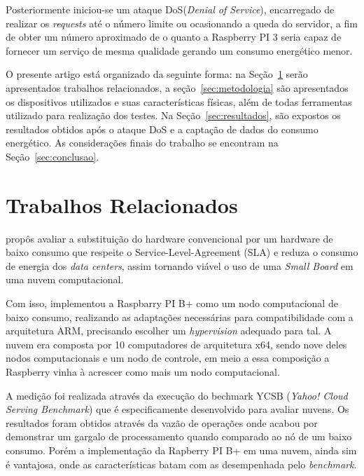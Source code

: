 \documentclass[12pt]{article}
\begin{document}
  Posteriormente iniciou-se um ataque DoS(\textit{Denial of Service}), encarregado de realizar os \textit{requests} até o número limite ou ocasionando a queda do servidor, a fim de obter um número aproximado de o quanto a Raspberry PI 3 seria capaz de fornecer um serviço de mesma qualidade gerando um consumo energético menor.



  O presente artigo está organizado da seguinte forma: na Seção~\ref{sec:trabCorrelatos} serão apresentados trabalhos relacionados, a seção~\ref{sec:metodologia} são apresentados os dispositivos utilizados e suas características físicas, além de todas ferramentas utilizado para realização dos testes. Na Seção~\ref{sec:resultados}, são expostos os resultados obtidos após o ataque DoS e a captação de dados do consumo energético. As considerações finais do trabalho se encontram na Seção~\ref{sec:conclusao}.


\section{Trabalhos Relacionados} \label{sec:trabCorrelatos}
  
 
   \cite{Joao} propôs avaliar a substituição do hardware convencional por um hardware de baixo consumo que respeite o Service-Level-Agreement (SLA) e reduza o consumo de energia dos \textit{data centers}, assim tornando viável o uso de uma \textit{Small Board} em uma nuvem computacional.

  Com isso, implementou a Raspbarry PI B+ como um nodo computacional de baixo consumo, realizando as adaptações necessárias para compatibilidade com a arquitetura ARM, precisando escolher um \textit{hypervision} adequado para tal. A nuvem era composta por 10 computadores de arquitetura x64, sendo nove deles nodos computacionais e um nodo de controle, em meio a essa composição a Raspberry vinha à acrescer como mais um nodo computacional.


  A medição foi realizada através da execução do bechmark YCSB (\textit{Yahoo! Cloud Serving Benchmark}) que é especificamente desenvolvido para avaliar nuvens. Os resultados foram obtidos através da vazão de operações onde acabou por demonstrar um gargalo de processamento quando comparado ao nó de um baixo consumo. Porém a implementação da Rapberry PI B+ em uma nuvem, ainda sim é vantajosa, onde as características batam com as desempenhada pelo \textit{benchmark}.
\end{document}
